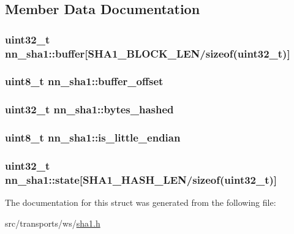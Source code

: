 \subsection{Member Data Documentation}
\subsubsection[{buffer}]{\setlength{\rightskip}{0pt plus 5cm}uint32\+\_\+t nn\+\_\+sha1\+::buffer\mbox{[}{\bf S\+H\+A1\+\_\+\+B\+L\+O\+C\+K\+\_\+\+L\+EN}/sizeof(uint32\+\_\+t)\mbox{]}}\hypertarget{structnn__sha1_a7535f28482cd3610ecc5b0d0b72fd276}{}\label{structnn__sha1_a7535f28482cd3610ecc5b0d0b72fd276}
\subsubsection[{buffer\+\_\+offset}]{\setlength{\rightskip}{0pt plus 5cm}uint8\+\_\+t nn\+\_\+sha1\+::buffer\+\_\+offset}\hypertarget{structnn__sha1_a5eda1144a7fdd41d01c70d38cdf76bfd}{}\label{structnn__sha1_a5eda1144a7fdd41d01c70d38cdf76bfd}
\subsubsection[{bytes\+\_\+hashed}]{\setlength{\rightskip}{0pt plus 5cm}uint32\+\_\+t nn\+\_\+sha1\+::bytes\+\_\+hashed}\hypertarget{structnn__sha1_a2a408e88ffe4f2331227950f66e61018}{}\label{structnn__sha1_a2a408e88ffe4f2331227950f66e61018}
\subsubsection[{is\+\_\+little\+\_\+endian}]{\setlength{\rightskip}{0pt plus 5cm}uint8\+\_\+t nn\+\_\+sha1\+::is\+\_\+little\+\_\+endian}\hypertarget{structnn__sha1_ae62f56096d4ed975f2c463994331091b}{}\label{structnn__sha1_ae62f56096d4ed975f2c463994331091b}
\subsubsection[{state}]{\setlength{\rightskip}{0pt plus 5cm}uint32\+\_\+t nn\+\_\+sha1\+::state\mbox{[}{\bf S\+H\+A1\+\_\+\+H\+A\+S\+H\+\_\+\+L\+EN}/sizeof(uint32\+\_\+t)\mbox{]}}\hypertarget{structnn__sha1_ad3a14228d8f947c5d6a1617f7e4314a5}{}\label{structnn__sha1_ad3a14228d8f947c5d6a1617f7e4314a5}


The documentation for this struct was generated from the following file\+:\begin{DoxyCompactItemize}
\item 
src/transports/ws/\hyperlink{sha1_8h}{sha1.\+h}\end{DoxyCompactItemize}
